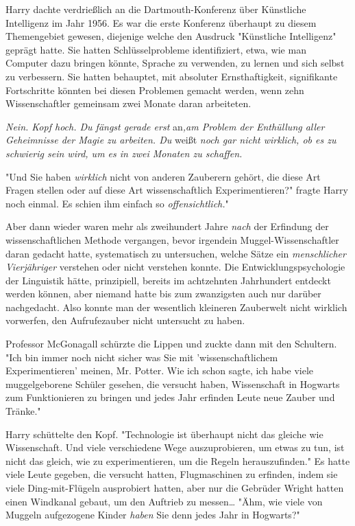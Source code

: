{Harry dachte verdrießlich an die Dartmouth-Konferenz über Künstliche Intelligenz im Jahr 1956. Es war die erste Konferenz überhaupt zu diesem Themengebiet gewesen, diejenige welche den Ausdruck "Künstliche Intelligenz" geprägt hatte. Sie hatten Schlüsselprobleme identifiziert, etwa, wie man Computer dazu bringen könnte, Sprache zu verwenden, zu lernen und sich selbst zu verbessern. Sie hatten behauptet, mit absoluter Ernsthaftigkeit, signifikante Fortschritte könnten bei diesen Problemen gemacht werden, wenn zehn Wissenschaftler gemeinsam zwei Monate daran arbeiteten.

\emph{Nein. Kopf hoch. Du fängst gerade erst} an\emph{,am Problem der Enthüllung aller Geheimnisse der Magie zu arbeiten. Du} weißt \emph{noch gar nicht wirklich, ob es zu schwierig sein wird, um es in zwei Monaten zu schaffen.}

"Und Sie haben \emph{wirklich} nicht von anderen Zauberern gehört, die diese Art Fragen stellen oder auf diese Art wissenschaftlich Experimentieren?" fragte Harry noch einmal. Es schien ihm einfach so \emph{offensichtlich.}"

Aber dann wieder waren mehr als zweihundert Jahre \emph{nach} der Erfindung der wissenschaftlichen Methode vergangen, bevor irgendein Muggel-Wissenschaftler daran gedacht hatte, systematisch zu untersuchen, welche Sätze ein \emph{menschlicher Vierjähriger} verstehen oder nicht verstehen konnte. Die Entwicklungspsychologie der Linguistik hätte, prinzipiell, bereits im achtzehnten Jahrhundert entdeckt werden können, aber niemand hatte bis zum zwanzigsten auch nur darüber nachgedacht. Also konnte man der wesentlich kleineren Zauberwelt nicht wirklich vorwerfen, den Aufrufezauber nicht untersucht zu haben.

Professor McGonagall schürzte die Lippen und zuckte dann mit den Schultern. "Ich bin immer noch nicht sicher was Sie mit 'wissenschaftlichem Experimentieren' meinen, Mr. Potter. Wie ich schon sagte, ich habe viele muggelgeborene Schüler gesehen, die versucht haben, Wissenschaft in Hogwarts zum Funktionieren zu bringen und jedes Jahr erfinden Leute neue Zauber und Tränke."

Harry schüttelte den Kopf. "Technologie ist überhaupt nicht das gleiche wie Wissenschaft. Und viele verschiedene Wege auszuprobieren, um etwas zu tun, ist nicht das gleich, wie zu experimentieren, um die Regeln herauszufinden." Es hatte viele Leute gegeben, die versucht hatten, Flugmaschinen zu erfinden, indem sie viele Ding-mit-Flügeln ausprobiert hatten, aber nur die Gebrüder Wright hatten einen Windkanal gebaut, um den Auftrieb zu messen… "Ähm, wie viele von Muggeln aufgezogene Kinder \emph{haben} Sie denn jedes Jahr in Hogwarts?"

}

